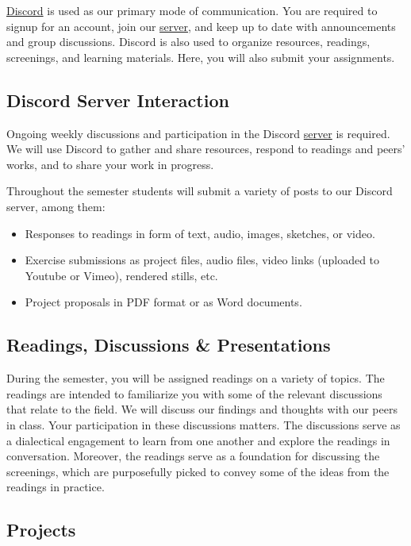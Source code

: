 \href{http://discordapp.com/}{Discord} is used as our primary mode of communication. You are required to signup for an account, join our \href{\discordURL}{server}, and keep up to date with announcements and group discussions. Discord is also used to organize resources, readings, screenings, and learning materials. Here, you will also submit your assignments.

\subsection{Discord Server Interaction}
Ongoing weekly discussions and participation in the Discord \href{\discordURL}{server} is required. We will use Discord to gather and share resources, respond to readings and peers' works, and to share your work in progress.

Throughout the semester students will submit a variety of posts to our Discord server, among them:
\begin{itemize}
      \tightlist
      \item Responses to readings in form of text, audio, images, sketches, or video.
      \item Exercise submissions as project files, audio files, video links (uploaded to Youtube or Vimeo), rendered stills, etc.
      \item Project proposals in PDF format or as Word documents.
\end{itemize}

\subsection{Readings, Discussions \& Presentations}

During the semester, you will be assigned readings on a variety of topics. The readings are intended to familiarize you with some of the relevant discussions that relate to the field. We will discuss our findings and thoughts with our peers in class. Your participation in these discussions matters. The discussions serve as a dialectical engagement to learn from one another and explore the readings in conversation. Moreover, the readings serve as a foundation for discussing the screenings, which are purposefully picked to convey some of the ideas from the readings in practice.

\subsection{Projects}

